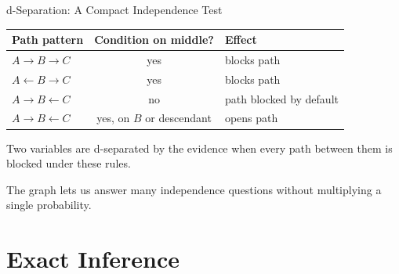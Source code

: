 \documentclass[aspectratio=169,10pt]{beamer}
\begin{document}
\begin{frame}[shrink=10]{d-Separation: A Compact Independence Test}
  \begin{center}
  \renewcommand{\arraystretch}{1.30}
  \begin{tabular}{l|c|l}
    \textbf{Path pattern} & \textbf{Condition on middle?} & \textbf{Effect} \\\hline
    $A\rightarrow B\rightarrow C$ & yes & blocks path \\
    $A\leftarrow B\rightarrow C$ & yes & blocks path \\
    $A\rightarrow B\leftarrow C$ & no & path blocked by default \\
    $A\rightarrow B\leftarrow C$ & yes, on $B$ or descendant & opens path \\
  \end{tabular}
  \end{center}

  \begin{cpdefinition}
    Two variables are d-separated by the evidence when every path between them is blocked under these rules.
  \end{cpdefinition}

  \begin{keyidea}
    The graph lets us answer many independence questions without multiplying a single probability.
  \end{keyidea}
\end{frame}

\section{Exact Inference}
\end{document}
